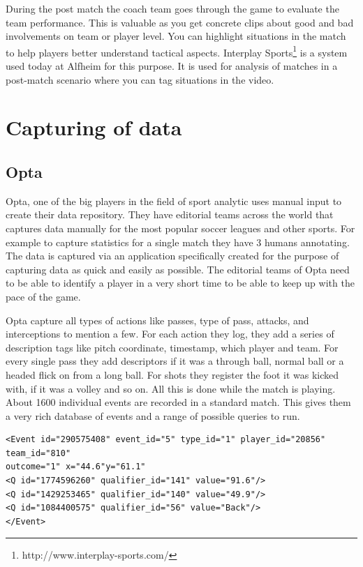 During the post match the coach team goes through the game to evaluate the team performance. This is valuable as you get concrete clips about good and bad involvements on team or player level. You can highlight situations in the match to help players better understand tactical aspects. Interplay Sports\footnote{ http://www.interplay-sports.com/} is a system used today at Alfheim for this purpose. It is used for analysis of matches in a post-match scenario where you can tag situations in the video. 

\section{Capturing of data}
\subsection{Opta}

Opta, one of the big players in the field of sport analytic uses manual input to create their data repository. They have editorial teams across the world that captures data manually for the most popular soccer leagues and other sports. For example to capture statistics for a single match they have 3 humans annotating. The data is captured via an application specifically created for the purpose of capturing data as quick and easily as possible. The editorial teams of Opta need to be able to identify a player in a very short time to be able to keep up with the pace of the game. 

Opta capture all types of actions like passes, type of pass, attacks, and interceptions to mention a few. For each action they log, they add a series of description tags like pitch coordinate, timestamp, which player and team. For every single pass they add descriptors if it was a through ball, normal ball or a headed flick on from a long ball. For shots they register the foot it was kicked with, if it was a volley and so on. All this is done while the match is playing. About 1600 individual events are recorded in a standard match. This gives them a very rich database of events and a range of possible queries to run. 

\begin{lstlisting}
<Event id="290575408" event_id="5" type_id="1" player_id="20856" team_id="810" 
outcome="1" x="44.6"y="61.1"
<Q id="1774596260" qualifier_id="141" value="91.6"/>
<Q id="1429253465" qualifier_id="140" value="49.9"/>
<Q id="1084400575" qualifier_id="56" value="Back"/>
</Event>
\end{lstlisting}

